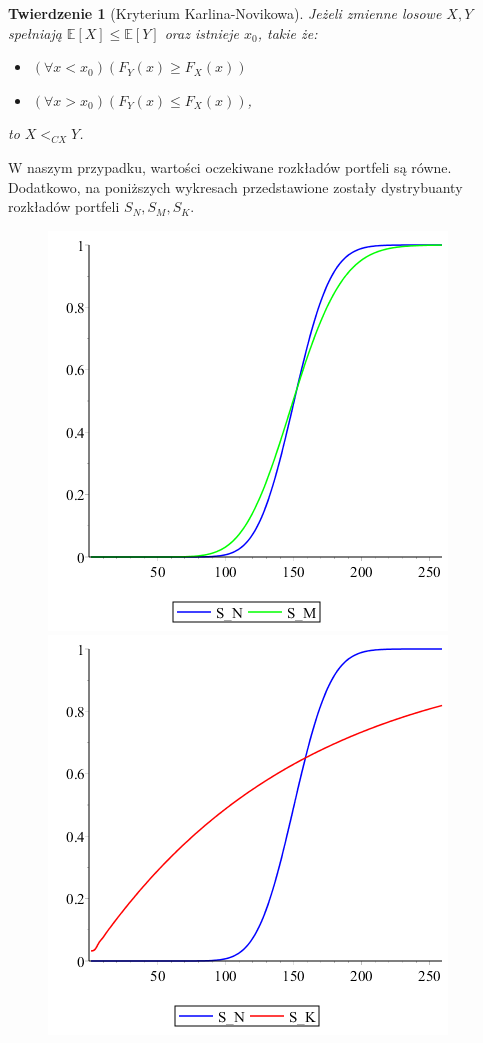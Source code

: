 \documentclass[12pt]{article}
\theoremstyle{twierdzenie}
\newtheorem{theorem}{Twierdzenie}[section]
\theoremstyle{definition}
\begin{document}
\begin{theorem}[Kryterium Karlina-Novikowa]
Jeżeli zmienne losowe $X,Y$ spełniają $\mathbb{E}[X]\leq\mathbb{E}[Y]$ oraz istnieje $x_0$, takie że:
\begin{itemize}
\item $(\forall x<x_0)(F_Y(x)\geq F_X(x))$
\item $(\forall x>x_0)(F_Y(x)\leq F_X(x))$,
\end{itemize}
to $X<_{CX}Y$.
\end{theorem}
W naszym przypadku, wartości oczekiwane rozkładów portfeli są równe. Dodatkowo, na poniższych wykresach przedstawione zostały dystrybuanty rozkładów portfeli $S_N,S_M,S_K$. 
\begin{figure}[H]
\begin{center}
\includegraphics[scale=.5]{cdfPNPM}
\includegraphics[scale=.5]{cdfPNPK}

\end{center}
\end{figure}
\end{document}
